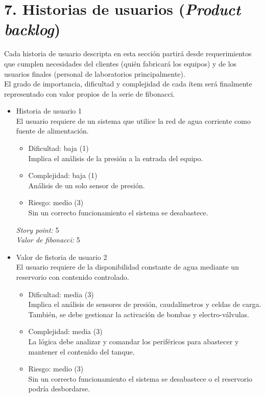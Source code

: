\documentclass[
11pt, %
]{charter}
\begin{document}
\section{7. Historias de usuarios (\textit{Product backlog})}
\label{sec:backlog}

Cada historia de usuario descripta en esta sección partirá desde requerimientos que cumplen necesidades del clientes (quién fabricará los equipos) y de los usuarios finales (personal de laboratorios principalmente).\\
El grado de importancia, dificultad y complejidad de cada ítem será finalmente representado con valor propios de la serie de fibonacci.

\begin{itemize}
\item Historia de usuario 1
\\El usuario requiere de un sistema que utilice la red de agua corriente como fuente de alimentación.
	\begin{itemize}
		\item Dificultad: baja (1)
		\\Implica el análisis de la presión a la entrada del equipo.
		\item Complejidad: baja (1)
		\\Análisis de un solo sensor de presión.
		\item Riesgo: medio (3)
		\\Sin un correcto funcionamiento el sistema se desabastece.
	\end{itemize}
\textit{Story point:} 5\\
\textit{Valor de fibonacci:} 5
\item Valor de fistoria de usuario 2
\\El usuario requiere de la disponibilidad constante de agua mediante un reservorio con contenido controlado.
	\begin{itemize}
		\item Dificultad: media (3)
		\\Implica el análisis de sensores de presión, caudalímetros y celdas de carga. También, se debe gestionar la activación de bombas y electro-válvulas.
		\item Complejidad: media (3)
		\\La lógica debe analizar y comandar los periféricos para abastecer y mantener el contenido del tanque.
		\item Riesgo: medio (3)
		\\Sin un correcto funcionamiento el sistema se desabastece o el reservorio podría desbordarse.

\end{itemize}
\end{itemize}
\end{document}
